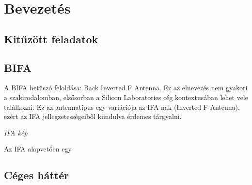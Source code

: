 \chapter{Bevezetés}
\section{Kitűzött feladatok}
\section{BIFA}
A BIFA betűszó feloldása: Back Inverted F Antenna. Ez az elnevezés nem gyakori a szakirodalomban, elsősorban a Silicon Laboratories cég kontextusában lehet vele találkozni. Ez az antennatípus egy variációja az IFA-nak (Inverted F Antenna), ezért az IFA jellegzetességeiből kiindulva érdemes tárgyalni.
\par
\begin{center}
\textit{IFA kép}
\end{center}
\par
Az IFA alapvetően egy 
\section{Céges háttér}